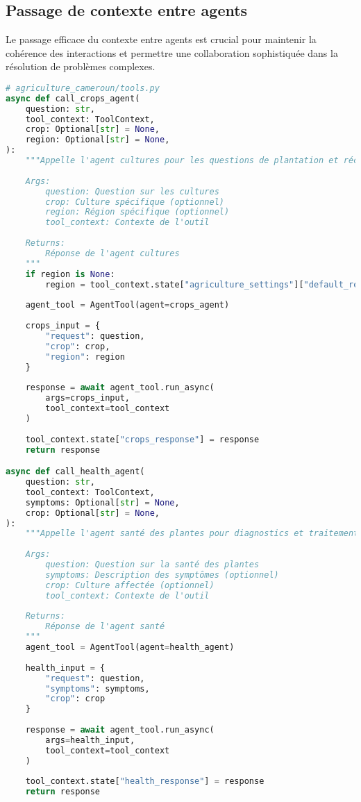 \subsection{Passage de contexte entre agents}

Le passage efficace du contexte entre agents est crucial pour maintenir la cohérence des interactions et permettre une collaboration sophistiquée dans la résolution de problèmes complexes.

 
\begin{lstlisting}[language=Python, caption=Gestion du contexte partagé entre agents]
# agriculture_cameroun/tools.py
async def call_crops_agent(
    question: str,
    tool_context: ToolContext,
    crop: Optional[str] = None,
    region: Optional[str] = None,
):
    """Appelle l'agent cultures pour les questions de plantation et récolte.
    
    Args:
        question: Question sur les cultures
        crop: Culture spécifique (optionnel)
        region: Région spécifique (optionnel)
        tool_context: Contexte de l'outil
    
    Returns:
        Réponse de l'agent cultures
    """
    if region is None:
        region = tool_context.state["agriculture_settings"]["default_region"]
    
    agent_tool = AgentTool(agent=crops_agent)
    
    crops_input = {
        "request": question,
        "crop": crop,
        "region": region
    }
    
    response = await agent_tool.run_async(
        args=crops_input,
        tool_context=tool_context
    )
    
    tool_context.state["crops_response"] = response
    return response

async def call_health_agent(
    question: str,
    tool_context: ToolContext,
    symptoms: Optional[str] = None,
    crop: Optional[str] = None,
):
    """Appelle l'agent santé des plantes pour diagnostics et traitements.
    
    Args:
        question: Question sur la santé des plantes
        symptoms: Description des symptômes (optionnel)
        crop: Culture affectée (optionnel)
        tool_context: Contexte de l'outil
    
    Returns:
        Réponse de l'agent santé
    """
    agent_tool = AgentTool(agent=health_agent)
    
    health_input = {
        "request": question,
        "symptoms": symptoms,
        "crop": crop
    }
    
    response = await agent_tool.run_async(
        args=health_input,
        tool_context=tool_context
    )
    
    tool_context.state["health_response"] = response
    return response
\end{lstlisting}

